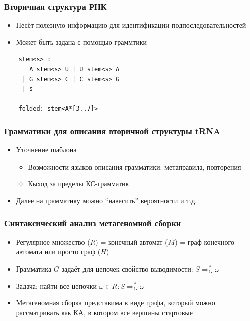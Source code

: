 \documentclass{beamer}
\begin{document}
\begin{frame}[fragile]
\transwipe[direction=90]
\frametitle{Вторичная структура РНК}
\begin{itemize}
    \item Несёт полезную информацию для идентификации подпоследовательностей
    \item Может быть задана с помощью граммтики
\end{itemize}
\begin{verbatim}
    stem<s> : 
       A stem<s> U | U stem<s> A 
     | G stem<s> C | C stem<s> G 
     | s

    folded: stem<A*[3..7]> 
\end{verbatim} 
\end{frame}

\begin{frame}[fragile]
  \transwipe[direction=90]
  \frametitle{Грамматики для описания вторичной структуры tRNA}
  \begin{itemize}
    \item Уточнение шаблона
    \begin{itemize}
       \item Возможности языков описания грамматики: метаправила, повторения
       \item Кыход за пределы КС-грамматик
    \end{itemize}
    \item Далее на грамматику можно ``навесить'' вероятности и т.д.
  \end{itemize}
\end{frame}

\begin{frame}[fragile]
  \transwipe[direction=90]
  \frametitle{Синтаксический анализ метагеномной сборки}
  \begin{itemize}
    \item Регулярное множество ($R$) = конечный автомат ($M$) = граф конечного автомата или просто 
    граф ($H$)
    \pause
    \item Грамматика $G$ задаёт для цепочек свойство выводимости: $S \Rightarrow^*_G \omega$
    \item Задача: найти все цепочки $\omega \in R : S \Rightarrow^*_G \omega$ 
    \item Метагеномная сборка представима в виде графа, который можно рассматривать как КА, в 
    котором все вершины стартовые
  \end{itemize}
\end{frame}
\end{document}
